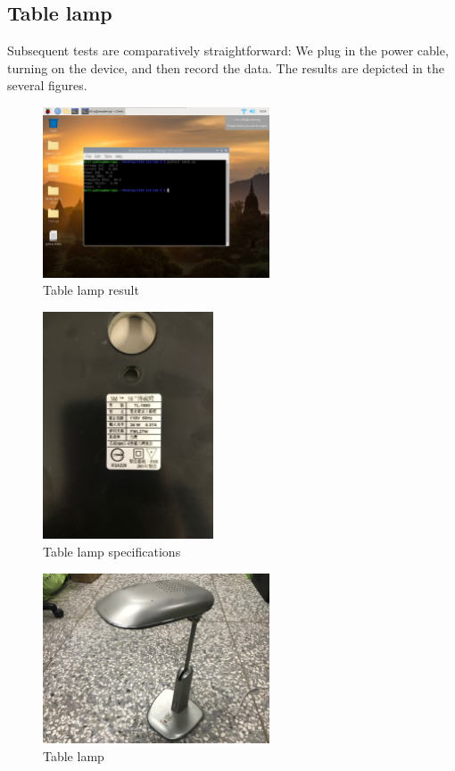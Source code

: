 \documentclass[12pt, a4paper, onside]{article}
\begin{document}
\subsection{Table lamp}
Subsequent tests are comparatively straightforward: We plug in the power cable, turning on the device, and then record the data. The results are depicted in the several figures.
\begin{figure}[h]
  \centering
  \includegraphics[width=0.6\textwidth]{img/3_res_table_lamp}
  \caption{Table lamp result}
\end{figure}
\begin{figure}[h]
  \centering
  \includegraphics[angle=-90, origin=c, width=0.45\textwidth]{img/3_spe_table_lamp}
  \caption{Table lamp specifications}
\end{figure}
\begin{figure}[h]
  \centering
  \includegraphics[width=0.6\textwidth]{img/3_pic_table_lamp}
  \caption{Table lamp}
\end{figure}
\end{document}
